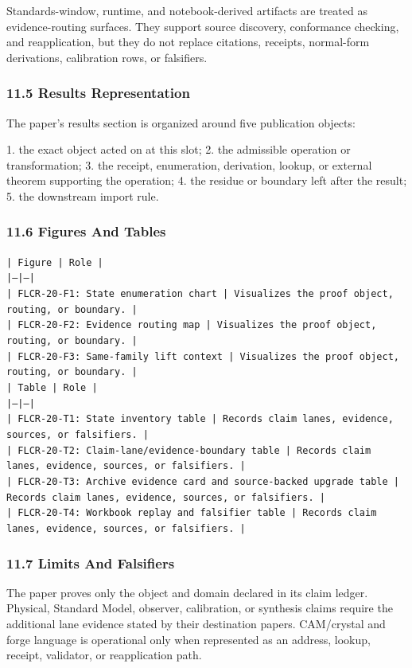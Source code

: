 \documentclass[11pt]{article}
\begin{document}
Standards-window, runtime, and notebook-derived artifacts are treated
as evidence-routing surfaces. They support source discovery, conformance
checking, and reapplication, but they do not replace citations, receipts,
normal-form derivations, calibration rows, or falsifiers.

\subsubsection*{11.5 Results Representation}

The paper's results section is organized around five publication objects:

1. the exact object acted on at this slot;
2. the admissible operation or transformation;
3. the receipt, enumeration, derivation, lookup, or external theorem supporting
   the operation;
4. the residue or boundary left after the result;
5. the downstream import rule.

\subsubsection*{11.6 Figures And Tables}

\noindent\texttt{| Figure | Role |}\\
\noindent\texttt{|---|---|}\\
\noindent\texttt{| FLCR-20-F1: State enumeration chart | Visualizes the proof object, routing, or boundary. |}\\
\noindent\texttt{| FLCR-20-F2: Evidence routing map | Visualizes the proof object, routing, or boundary. |}\\
\noindent\texttt{| FLCR-20-F3: Same-family lift context | Visualizes the proof object, routing, or boundary. |}\\

\noindent\texttt{| Table | Role |}\\
\noindent\texttt{|---|---|}\\
\noindent\texttt{| FLCR-20-T1: State inventory table | Records claim lanes, evidence, sources, or falsifiers. |}\\
\noindent\texttt{| FLCR-20-T2: Claim-lane/evidence-boundary table | Records claim lanes, evidence, sources, or falsifiers. |}\\
\noindent\texttt{| FLCR-20-T3: Archive evidence card and source-backed upgrade table | Records claim lanes, evidence, sources, or falsifiers. |}\\
\noindent\texttt{| FLCR-20-T4: Workbook replay and falsifier table | Records claim lanes, evidence, sources, or falsifiers. |}\\

\subsubsection*{11.7 Limits And Falsifiers}

The paper proves only the object and domain declared in its claim ledger.
Physical, Standard Model, observer, calibration, or synthesis claims require
the additional lane evidence stated by their destination papers. CAM/crystal
and forge language is operational only when represented as an address, lookup,
receipt, validator, or reapplication path.
\end{document}
